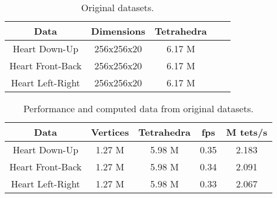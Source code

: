 
%
%
%


\begin{table}[!htb]
  \centering
  \begin{tabular}{|c||c|c|c|c|}
    \hline
    Data             &  Dimensions & Tetrahedra \\ \hline
    \hline
    Heart Down-Up    &  256x256x20 &   6.17 M   \\
    Heart Front-Back &  256x256x20 &   6.17 M   \\
    Heart Left-Right &  256x256x20 &   6.17 M   \\
    \hline
  \end{tabular}
  \caption[Original data]{
    \centering
    Original datasets.
  }
  \label{tab:original_datasets}
\end{table}


\begin{table}[!htb]
  \centering
  \begin{tabular}{|c||c|c|c|c|}
    \hline
    Data             & Vertices & Tetrahedra &  fps  & M tets/s \\ \hline
    \hline
    Heart Down-Up    &  1.27 M  &   5.98 M   &  0.35 &  2.183   \\
    Heart Front-Back &  1.27 M  &   5.98 M   &  0.34 &  2.091   \\
    Heart Left-Right &  1.27 M  &   5.98 M   &  0.33 &  2.067   \\
    \hline
  \end{tabular}
  \caption[Performance and computed data]{
    \centering
    Performance and computed data from original datasets.
  }
  \label{tab:computed_data}
\end{table}

%
